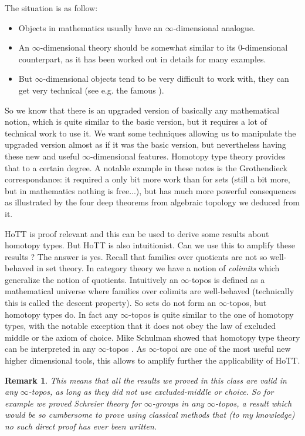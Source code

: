 \documentclass{article}
\newtheorem{remark}{Remark}
\begin{document}
The situation is as follow:
\begin{itemize}
\item Objects in mathematics usually have an $\infty$-dimensional analogue.
\item An $\infty$-dimensional theory should be somewhat similar to its $0$-dimensional counterpart, as it has been worked out in details for many examples.
\item But $\infty$-dimensional objects tend to be very difficult to work with, they can get very technical (see e.g. the famous \cite{lurie2009higher}).
\end{itemize}

So we know that there is an upgraded version of basically any mathematical notion, which is quite similar to the basic version, but it requires a lot of technical work to use it. We want some techniques allowing us to manipulate the upgraded version almost as if it was the basic version, but nevertheless having these new and useful $\infty$-dimensional features. Homotopy type theory provides that to a certain degree. A notable example in these notes is the Grothendieck correspondance: it required a only bit more work than for sets (still a bit more, but in mathematics nothing is free...), but has much more powerful consequences as illustrated by the four deep theorems from algebraic topology we deduced from it. 

HoTT is proof relevant and this can be used to derive some results about homotopy types. But HoTT is also intuitionist. Can we use this to amplify these results ? The answer is yes. Recall that families over quotients are not so well-behaved in set theory. In category theory we have a notion of \emph{colimits} which generalize the notion of quotients. Intuitively an $\infty$-topos is defined as a mathematical universe where families over colimits are well-behaved (technically this is called the descent property). So sets do not form an $\infty$-topos, but homotopy types do. In fact any $\infty$-topos is quite similar to the one of homotopy types, with the notable exception that it does not obey the law of excluded middle or the axiom of choice. Mike Schulman showed that homotopy type theory can be interpreted in any $\infty$-topos \cite{shulman2019all}. As $\infty$-topoi are one of the most useful new higher dimensional tools, this allows to amplify further the applicability of HoTT.

\begin{remark}
This means that all the results we proved in this class are valid in any $\infty$-topos, as long as they did not use excluded-middle or choice. So for example we proved Schreier theory for $\infty$-groups in any $\infty$-topos, a result which would be so cumbersome to prove using classical methods that (to my knowledge) no such direct proof has ever been written.
\end{remark}
\end{document}

